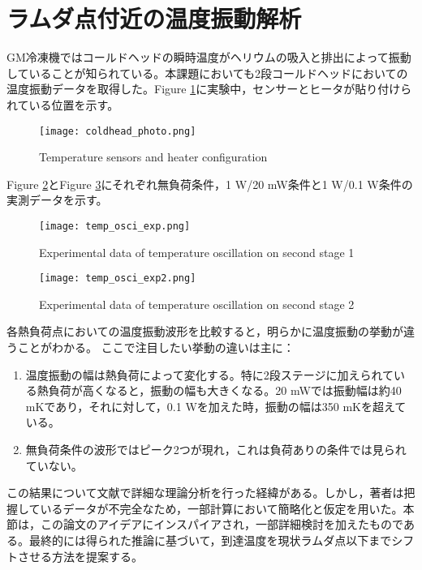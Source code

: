\section{ラムダ点付近の温度振動解析}
GM冷凍機ではコールドヘッドの瞬時温度がヘリウムの吸入と排出によって振動していることが知られている。本課題においても2段コールドヘッドにおいての温度振動データを取得した。Figure \ref{fig:coldhead_photo}に実験中，センサーとヒータが貼り付けられている位置を示す。
\begin{figure}[h!]
\begin{center}
\texttt{[image: coldhead\_photo.png]}
\caption{Temperature sensors and heater configuration}
\label{fig:coldhead_photo}
\end{center}
\end{figure}

Figure \ref{fig:temp_osci1}とFigure \ref{fig:temp_osci2}にそれぞれ無負荷条件，1 W/20 mW条件と1 W/0.1 W条件の実測データを示す。

\begin{figure}[h!]
\begin{center}
\texttt{[image: temp\_osci\_exp.png]}
\caption{Experimental data of temperature oscillation on second stage 1}
\label{fig:temp_osci1}
\end{center}
\end{figure}

\begin{figure}[h!]
\begin{center}
\texttt{[image: temp\_osci\_exp2.png]}
\caption{Experimental data of temperature oscillation on second stage 2}
\label{fig:temp_osci2}
\end{center}
\end{figure}

各熱負荷点においての温度振動波形を比較すると，明らかに温度振動の挙動が違うことがわかる。
ここで注目したい挙動の違いは主に：
\begin{enumerate}
\item 温度振動の幅は熱負荷によって変化する。特に2段ステージに加えられている熱負荷が高くなると，振動の幅も大きくなる。20 mWでは振動幅は約40 mKであり，それに対して，0.1 Wを加えた時，振動の幅は350 mKを超えている。
\item 無負荷条件の波形ではピーク2つが現れ，これは負荷ありの条件では見られていない。
\end{enumerate}
この結果について文献\cite{lambda}で詳細な理論分析を行った経緯がある。しかし，著者は把握しているデータが不完全なため，一部計算において簡略化と仮定を用いた。本節は，この論文のアイデアにインスパイアされ，一部詳細検討を加えたものである。最終的には得られた推論に基づいて，到達温度を現状ラムダ点以下までシフトさせる方法を提案する。



